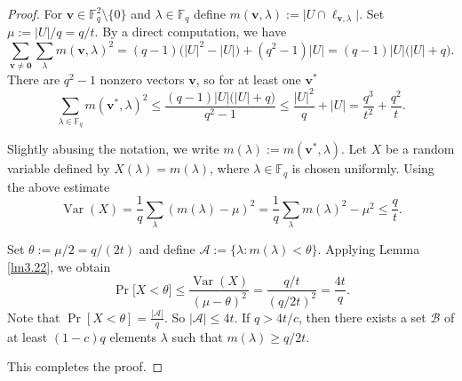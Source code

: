 \documentclass[11pt]{article}
\theoremstyle{definition}
\begin{document}
\begin{proof}
For $\mathbf{v}\in \mathbb{F}_q^2\setminus \{0\}$ and $\lambda\in\mathbb{F}_{q}$ define
$
m(\mathbf{v},\lambda):=\bigl|U\cap\ell_{\mathbf{v},\lambda}\bigr|.
$
Set
$
\mu:=|U|/q=q/t.
$ By a direct computation, we have
\[
\sum_{\mathbf{v}\neq \mathbf{0}}\sum_{\lambda}m(\mathbf{v},\lambda)^{2}
     =(q-1)\bigl(|U|^{2}-|U|\bigr)+(q^{2}-1)|U|
     =(q-1)|U|\bigl(|U|+q\bigr).
\]
There are $q^{2}-1$ nonzero vectors $\mathbf{v}$, so for at least one
$\mathbf{v}^{\ast}$
\[
\sum_{\lambda\in \mathbb{F}_q}m(\mathbf{v}^{\ast},\lambda)^{2}
     \le\frac{(q-1)|U|\bigl(|U|+q\bigr)}{q^{2}-1}
     \le\frac{|U|^{2}}{q}+|U|
     =\frac{q^{3}}{t^{2}}+\frac{q^{2}}{t}.
\]

Slightly abusing the notation, we write $m(\lambda):=m(\mathbf{v}^{\ast},\lambda)$. Let $X$ be a random variable defined by $X(\lambda)=m(\lambda)$, where $\lambda\in \mathbb{F}_q$ is chosen uniformly.  Using the above estimate
\[
\operatorname{Var}(X)
  =\frac{1}{q}\sum_{\lambda}(m(\lambda)-\mu)^{2}
  =\frac{1}{q}\sum_{\lambda}m(\lambda)^{2}-\mu^{2}
  \le\frac{q}{t}.
\]

Set $\theta:=\mu/2=q/(2t)$ and define
$\mathcal{A}:=\{\lambda:m(\lambda)<\theta\}$.
Applying Lemma \ref{lm3.22}, we obtain
\[
\Pr\bigl[X<\theta\bigr]
   \le\frac{\operatorname{Var}(X)}{(\mu-\theta)^{2}}
   =\frac{q/t}{(q/2t)^{2}}
   =\frac{4t}{q}.
\]
Note that $\Pr[X<\theta]=\frac{|\mathcal{A}|}{q}$. So $|\mathcal{A}|\le 4t$.
If $q>4t/c$, then there exists a set $\mathcal{B}$ of at least $(1-c)q$ elements $\lambda$ such that $m(\lambda)\ge q/2t$.

This completes the proof.
\end{proof}
\end{document}
